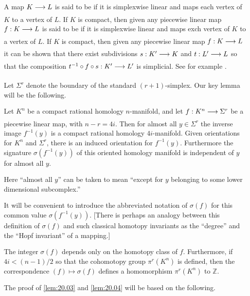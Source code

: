 \documentclass[../main]{subfiles}
\begin{document}
A map $K\varrightarrow{} L$ is said to be  if it is simplexwise linear and maps each vertex of $K$ to a vertex of $L$. If $K$ is compact, then given any piecewise linear map $f:K \varrightarrow{} L$ is said to be  if it is simplexwise linear and maps exch vertex of $K$ to a vertex of $L$. If $K$ is compact, then given any piecewise linear map $f:K \varrightarrow{} L$ it can be shown that there exist subdivisions $s:K' \varrightarrow{} K$ and $t:L' \varrightarrow{} L$ so that the composition $t^{-1} \circ f \circ s:K' \varrightarrow{} L'$ is simplicial. See for example \cite[p. 17]{rourke2012introduction}.

Let $\Sigma^r$ denote the boundary of the standard $(r+1)$-simplex. Our key lemma will be the following.

\begin{lemma}
\label{lem:20.03}
Let $K^n$ be a compact rational homology $n$-manifold, and let $f:K^n \varrightarrow{} \Sigma^r$ be a piecewise linear map, with $n-r=4i$. Then for almost all $y \in \Sigma^r$ the inverse image $f^{-1}(y)$ is a compact rational homology $4i$-manifold. Given orientations for $K^n$ and $\Sigma^r$, there is an induced orientation for $f^{-1}(y)$. Furthermore the signature $\sigma(f^{-1}(y))$ of this oriented homology manifold is independent of $y$ for almost all $y$.
\end{lemma}
Here ``almost all $y$'' can be taken to mean ``except for $y$ belonging to some lower dimensional subcomplex.''

It will be convenient to introduce the abbreviated notation of $\sigma(f)$ for this common value $\sigma(f^{-1}(y))$. [There is perhaps an analogy between this definition of $\sigma(f)$ and such classical homotopy invariants as the ``degree'' and the ``Hopf invariant'' of a mapping.]

\begin{lemma}
\label{lem:20.04}
The integer $\sigma(f)$ depends only on the homotopy class of $f$. Furthermore, if $4i < (n-1)/2$ so that the cohomotopy group $\pi^r(K^n)$ is defined, then the correspondence $(f) \mapsto \sigma(f)$ defines a homomorphism $\pi^r(K^n)$ to $\mathbb{Z}$.
\end{lemma}
The proof of \ref{lem:20.03} and \ref{lem:20.04} will be based on the following.
\end{document}
